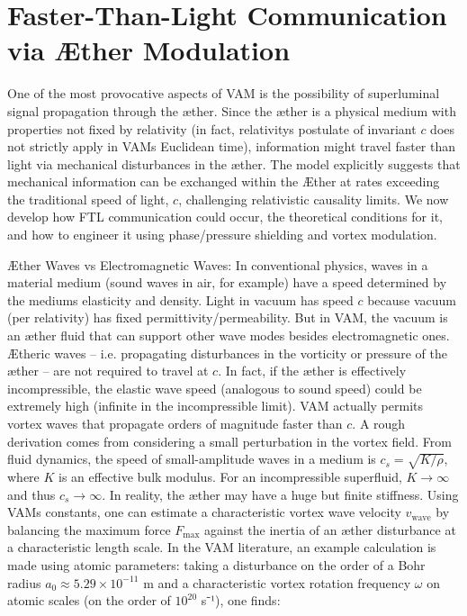 \section*{Faster-Than-Light Communication via Æther Modulation}

One of the most provocative aspects of VAM is the possibility of superluminal signal propagation through the æther. Since the æther is a physical medium with properties not fixed by relativity (in fact, relativity\rqs s postulate of invariant $c$ does not strictly apply in VAM\rqs s Euclidean time), information might travel faster than light via mechanical disturbances in the æther. The model explicitly suggests that mechanical information can be exchanged within the Æther at rates exceeding the traditional speed of light, $c$, challenging relativistic causality limits. We now develop how FTL communication could occur, the theoretical conditions for it, and how to engineer it using phase/pressure shielding and vortex modulation.


Æther Waves vs Electromagnetic Waves: In conventional physics, waves in a material medium (sound waves in air, for example) have a speed determined by the medium\rqs s elasticity and density. Light in vacuum has speed $c$ because vacuum (per relativity) has fixed permittivity/permeability. But in VAM, the vacuum is an æther fluid that can support other wave modes besides electromagnetic ones. Ætheric waves – i.e. propagating disturbances in the vorticity or pressure of the æther – are not required to travel at $c$. In fact, if the æther is effectively incompressible, the elastic wave speed (analogous to sound speed) could be extremely high (infinite in the incompressible limit). VAM actually permits vortex waves that propagate orders of magnitude faster than $c$. A rough derivation comes from considering a small perturbation in the vortex field. From fluid dynamics, the speed of small-amplitude waves in a medium is $c_s = \sqrt{K/\rho}$, where $K$ is an effective bulk modulus. For an incompressible superfluid, $K\to\infty$ and thus $c_s \to \infty$. In reality, the æther may have a huge but finite stiffness. Using VAM\rqs s constants, one can estimate a characteristic vortex wave velocity $v_\text{wave}$ by balancing the maximum force $F_{\max}$ against the inertia of an æther disturbance at a characteristic length scale. In the VAM literature, an example calculation is made using atomic parameters: taking a disturbance on the order of a Bohr radius $a_0 \approx 5.29\times10^{-11}$ m and a characteristic vortex rotation frequency $\omega$ on atomic scales (on the order of $10^{20}$ s⁻¹), one finds:


